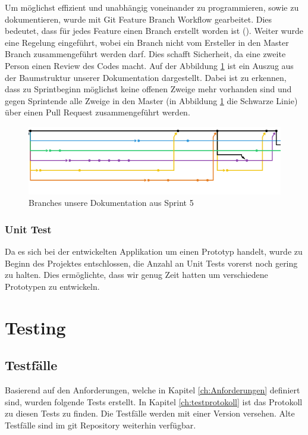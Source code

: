 \documentclass[a4paper]{scrreprt}
\begin{document}
Um möglichst effizient und unabhängig voneinander zu programmieren, sowie zu dokumentieren, wurde mit Git Feature Branch Workflow gearbeitet. Dies bedeutet, dass für jedes Feature einen Branch erstellt worden ist (\cite{gitFeatureBranchWorkflow}). Weiter wurde eine Regelung eingeführt, wobei ein Branch nicht vom Ersteller in den Master Branch zusammengeführt werden darf. Dies schafft Sicherheit, da eine zweite Person einen Review des Codes macht.
Auf der Abbildung \ref{fig:FeatureBranchWorkflow} ist ein Auszug aus der Baumstruktur unserer Dokumentation dargestellt. Dabei ist zu erkennen, dass zu Sprintbeginn möglichst keine offenen Zweige mehr vorhanden sind und gegen Sprintende alle Zweige in den Master (in Abbildung \ref{fig:FeatureBranchWorkflow} die Schwarze Linie) über einen Pull Request zusammengeführt werden.

\begin{figure}[h!]
	\center
	\includegraphics[width=\textwidth]{GitFeatureBranchWorkflow.png}
	\caption{Branches unsere Dokumentation aus Sprint 5}
	\label{fig:FeatureBranchWorkflow}
\end{figure}

\subsubsection{Unit Test}
Da es sich bei der entwickelten Applikation um einen Prototyp handelt, wurde zu Beginn des Projektes entschlossen, die Anzahl an Unit Tests vorerst noch gering zu halten. Dies ermöglichte, dass wir genug Zeit hatten um verschiedene Prototypen zu entwickeln.

\section{Testing}

\subsection{Testfälle}
Basierend auf den Anforderungen, welche in Kapitel \ref{ch:Anforderungen} definiert sind, wurden folgende Tests erstellt. In Kapitel \ref{ch:testprotokoll} ist das Protokoll zu diesen Tests zu finden. Die Testfälle werden mit einer Version versehen. Alte Testfälle sind im git Repository weiterhin verfügbar.
\end{document}

